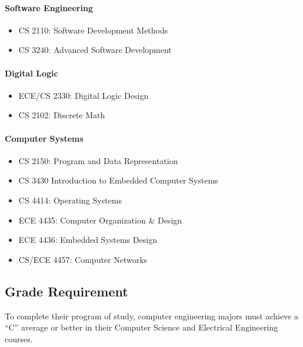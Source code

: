 \documentclass[10pt,letter]{book}
\newenvironment{itemlist}{
\begin{itemize}
\setlength{\itemsep}{0pt}
\setlength{\parskip}{0pt}}
{\end{itemize}}
\begin{document}
\paragraph{Software Engineering}
\begin{itemlist}
\item CS 2110: Software Development Methods
\item CS 3240: Advanced Software Development
\end{itemlist}

\paragraph{Digital Logic}
\begin{itemlist}
\item ECE/CS 2330: Digital Logic Design
\item CS 2102: Discrete Math
\end{itemlist}

\paragraph{Computer Systems}
\begin{itemlist}
\item CS 2150: Program and Data Representation
\item CS 3430 Introduction to Embedded Computer Systems
\item CS 4414: Operating Systems
\item ECE 4435: Computer Organization \& Design
\item ECE 4436: Embedded Systems Design
\item CS/ECE 4457: Computer Networks
\end{itemlist}

\subsection{Grade Requirement}
To complete their program of study, computer engineering majors must
achieve a “C” average or better in their Computer Science and
Electrical Engineering courses.


\end{document}
